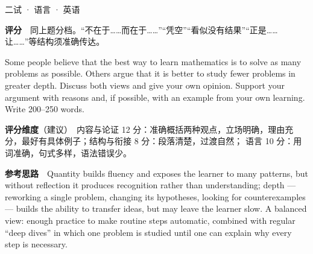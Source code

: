 \documentclass[cjk=noto, seal=first]{mojing-exam}
\begin{document}
\begin{paper}[time={建议 2 小时（训练设置）}, full=100]{二试 · 语言 · 英语}
\begin{questions}
\begin{solution}
\textbf{评分}　同上题分档。“不在于……而在于……”“凭空”“看似没有结果”“正是……让……”等结构须准确传达。
\end{solution}
\end{questions}


\begin{questions}
\question[30] Some people believe that the best way to learn mathematics is to solve as many problems as possible.
Others argue that it is better to study fewer problems in greater depth. Discuss both views and give your own opinion.
Support your argument with reasons and, if possible, with an example from your own learning. Write 200--250 words.
\answerspace{3cm}
\begin{solution}
\textbf{评分维度}（建议）　内容与论证 12 分：准确概括两种观点，立场明确，理由充分，最好有具体例子；结构与衔接 8 分：段落清楚，过渡自然；
语言 10 分：用词准确，句式多样，语法错误少。

\textbf{参考思路}　Quantity builds fluency and exposes the learner to many patterns, but without reflection it produces recognition rather
than understanding; depth --- reworking a single problem, changing its hypotheses, looking for counterexamples --- builds the ability to
transfer ideas, but may leave the learner slow. A balanced view: enough practice to make routine steps automatic, combined with regular
``deep dives'' in which one problem is studied until one can explain why every step is necessary.
\end{solution}
\end{questions}

\end{paper}
\end{document}
